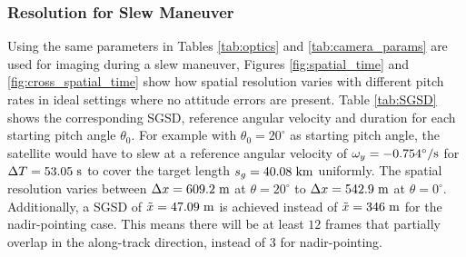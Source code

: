 \subsubsection{Resolution for Slew Maneuver} \label{sec:spacecraft_slew}
Using the same parameters in Tables \ref{tab:optics} and \ref{tab:camera_params} are used for imaging during a slew maneuver, Figures \ref{fig:spatial_time} and \ref{fig:cross_spatial_time} show how spatial resolution varies with different pitch rates in ideal settings where no attitude errors are present. Table \ref{tab:SGSD} shows the corresponding SGSD, reference angular velocity and duration for each starting pitch angle $\theta_0$. For example with $\theta_0=20^{\circ}$ as starting pitch angle, the satellite would have to slew at a reference angular velocity of $\omega_{y}= -0.754^{\circ}/\rm{s}$ for $\Delta T = 53.05 \hspace{3pt} \rm{s}$ to cover the target length $s_g=40.08 \hspace{3pt} \rm{km}$ uniformly. The spatial resolution varies between $\Delta x=609.2 \hspace{3pt} \rm{m}$ at $\theta=20^{\circ}$ to $\Delta x= 542.9 \hspace{3pt} \rm{m}$ at $\theta=0^{\circ}$. Additionally, a SGSD of $\tilde{x} = 47.09 \hspace{3pt} \rm{m}$ is achieved instead of $\tilde{x} = 346 \hspace{3pt} \rm{m}$ for the nadir-pointing case. This means there will be at least $12$ frames that partially overlap in the along-track direction, instead of $3$ for nadir-pointing. 

